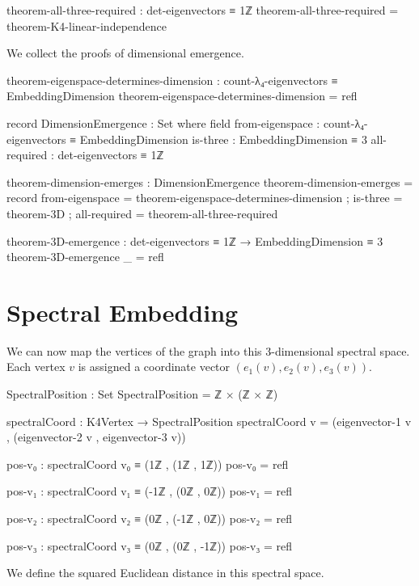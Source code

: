 \documentclass[11pt,a4paper]{book}
\begin{document}
\begin{code}
theorem-all-three-required : det-eigenvectors ≡ 1ℤ
theorem-all-three-required = theorem-K4-linear-independence

\end{code}

We collect the proofs of dimensional emergence.

\begin{code}
theorem-eigenspace-determines-dimension : 
  count-λ₄-eigenvectors ≡ EmbeddingDimension
theorem-eigenspace-determines-dimension = refl

record DimensionEmergence : Set where
  field
    from-eigenspace : count-λ₄-eigenvectors ≡ EmbeddingDimension
    is-three        : EmbeddingDimension ≡ 3
    all-required    : det-eigenvectors ≡ 1ℤ

theorem-dimension-emerges : DimensionEmergence
theorem-dimension-emerges = record
  { from-eigenspace = theorem-eigenspace-determines-dimension
  ; is-three = theorem-3D
  ; all-required = theorem-all-three-required
  }

theorem-3D-emergence : det-eigenvectors ≡ 1ℤ → EmbeddingDimension ≡ 3
theorem-3D-emergence _ = refl

\end{code}

\section{Spectral Embedding}

We can now map the vertices of the graph into this 3-dimensional spectral space. Each vertex $v$ is assigned a coordinate vector $(e_1(v), e_2(v), e_3(v))$.

\begin{code}
SpectralPosition : Set
SpectralPosition = ℤ × (ℤ × ℤ)

spectralCoord : K4Vertex → SpectralPosition
spectralCoord v = (eigenvector-1 v , (eigenvector-2 v , eigenvector-3 v))

pos-v₀ : spectralCoord v₀ ≡ (1ℤ , (1ℤ , 1ℤ))
pos-v₀ = refl

pos-v₁ : spectralCoord v₁ ≡ (-1ℤ , (0ℤ , 0ℤ))
pos-v₁ = refl

pos-v₂ : spectralCoord v₂ ≡ (0ℤ , (-1ℤ , 0ℤ))
pos-v₂ = refl

pos-v₃ : spectralCoord v₃ ≡ (0ℤ , (0ℤ , -1ℤ))
pos-v₃ = refl
\end{code}

We define the squared Euclidean distance in this spectral space.
\end{document}
